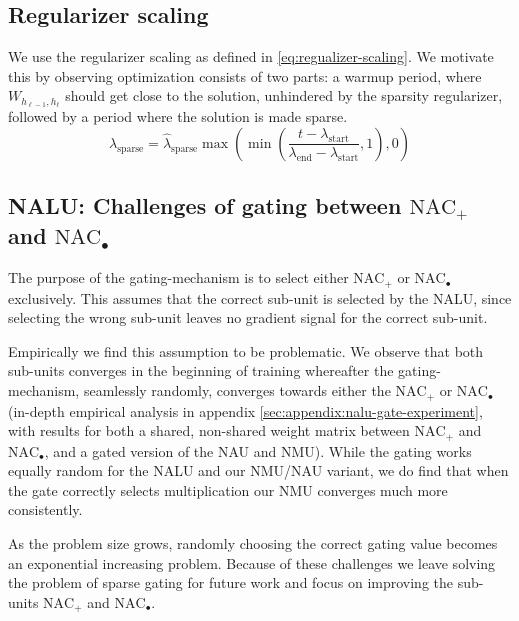 \subsection{Regularizer scaling}
We use the regularizer scaling as defined in \eqref{eq:regualizer-scaling}. We motivate this by observing optimization consists of two parts: a warmup period, where $W_{h_{\ell-1},h_\ell}$ should get close to the solution, unhindered by the sparsity regularizer, followed by a period where the solution is made sparse.
\begin{equation}
\lambda_{\mathrm{sparse}} = \hat{\lambda}_{\mathrm{sparse}} \max\left(\min\left(\frac{t - \lambda_{\mathrm{start}}}{\lambda_{\mathrm{end}} - \lambda_{\mathrm{start}}}, 1\right), 0\right)
\label{eq:regualizer-scaling}
\end{equation}

\subsection{NALU: Challenges of gating between \texorpdfstring{$\text{NAC}_{+}$}{NAC-add} and \texorpdfstring{$\text{NAC}_{\bullet}$}{NAC-mul}}
\label{sec:methods:gatting-issue}
The purpose of the gating-mechanism is to select either $\text{NAC}_{+}$ or $\text{NAC}_{\bullet}$ exclusively.
This assumes that the correct sub-unit is selected by the NALU, since selecting the wrong sub-unit leaves no gradient signal for the correct sub-unit.

Empirically we find this assumption to be problematic.
We observe that both sub-units converges in the beginning of training whereafter the gating-mechanism, seamlessly randomly, converges towards either the $\text{NAC}_{+}$ or $\text{NAC}_{\bullet}$ (in-depth empirical analysis in appendix \ref{sec:appendix:nalu-gate-experiment}, with results for both a shared, non-shared weight matrix between $\text{NAC}_{+}$ and $\text{NAC}_{\bullet}$, and a gated version of the NAU and NMU).
While the gating works equally random for the NALU and our NMU/NAU variant, we do find that when the gate correctly selects multiplication our NMU converges much more consistently.

As the problem size grows, randomly choosing the correct gating value becomes an exponential increasing problem. Because of these challenges we leave solving the problem of sparse gating for future work and focus on improving the sub-units $\text{NAC}_{+}$ and $\text{NAC}_{\bullet}$.